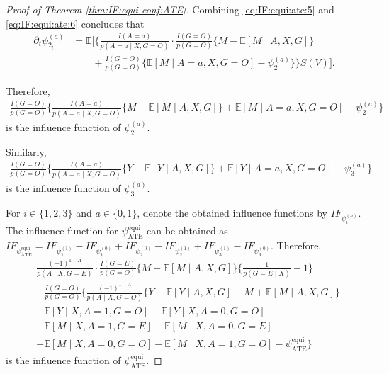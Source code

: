 \documentclass[10pt]{article}
\newcommand{\E}{\mathbb{E}}
\begin{document}
\begin{proof}[Proof of Theorem \ref{thm:IF:equi-conf:ATE}]
Combining \eqref{eq:IF:equi:ate:5} and \eqref{eq:IF:equi:ate:6} concludes that
\begin{align*}
\partial_t\psi^{(a)}_{2_t} 
&=\E
\Big[\Big\{
\frac{I(A=a)}{p(A=a\mid X,G=O)}\cdot\frac{I(G=O)}{p(G=O)}
\{M-\E[M\mid A,X,G]\}\\
&\qquad+\frac{I(G=O)}{p(G=O)}\{\E[M\mid A=a,X,G=O]-\psi_2^{(a)}\}
\Big\}S(V)\Big].
\end{align*}

Therefore, 
\begin{align*}
\frac{I(G=O)}{p(G=O)}\big\{\frac{I(A=a)}{p(A=a\mid X,G=O)}
\{M-\E[M\mid A,X,G]\}
+\E[M\mid A=a,X,G=O]-\psi_2^{(a)}\big\}
\end{align*}
is the influence function of $\psi_2^{(a)}$.


Similarly, 
\begin{align*}
\frac{I(G=O)}{p(G=O)}\big\{\frac{I(A=a)}{p(A=a\mid X,G=O)}
\{Y-\E[Y\mid A,X,G]\}
+\E[Y\mid A=a,X,G=O]-\psi_3^{(a)}\big\}
\end{align*}
is the influence function of $\psi_3^{(a)}$.



For $i\in\{1,2,3\}$ and $a\in\{0,1\}$, denote the obtained influence functions by $IF_{\psi_i^{(a)}}$.
The influence function for $\psi_{\text{ATE}}^{\text{equi}}$ can be obtained as
$IF_{\psi_{\text{ATE}}^{\text{equi}}}=
IF_{\psi_1^{(1)}}-IF_{\psi_1^{(0)}}
+IF_{\psi_2^{(0)}}-IF_{\psi_2^{(1)}}
+IF_{\psi_3^{(1)}}-IF_{\psi_3^{(0)}}$. Therefore,
\begin{align*}
&\frac{(-1)^{1-A}}{p(A\mid X,G=E)}\cdot\frac{I(G=E)}{p(G=O)}
\{M-\E[M\mid A,X,G]\}\{\frac{1}{p(G=E\mid X)}-1\}\\
&+\frac{I(G=O)}{p(G=O)}\big\{
\frac{(-1)^{1-A}}{p(A\mid X,G=O)}\{Y-\E[Y\mid A,X,G]-M+\E[M\mid A,X,G]\}\\
&+
\E[Y\mid X,A=1,G=O]-\E[Y\mid X,A=0,G=O]\\
&+\E[M\mid X,A=1,G=E]-\E[M\mid X,A=0,G=E]\\
&+\E[M\mid X,A=0,G=O]-\E[M\mid X,A=1,G=O]
-\psi_{\text{ATE}}^{\text{equi}}\big\}
\end{align*}
is the influence function of $\psi_{\text{ATE}}^{\text{equi}}$.


\end{proof}
\end{document}
